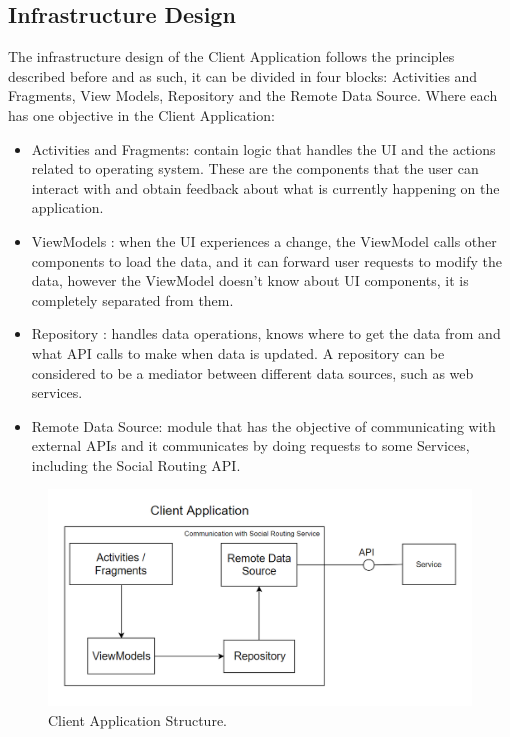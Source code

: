 \documentclass{article}
\begin{document}
        \subsection*{Infrastructure Design}
            The infrastructure design\cite{clientdesignandimplementationdocs} of the Client Application follows the principles described before and as such, it can be divided in four blocks: Activities and Fragments, 
            View Models, Repository and the Remote Data Source. Where each has one objective in the Client Application:
        \begin{itemize}
                \item Activities and Fragments: contain logic that handles the UI and the actions related to operating system. These are the components that 
                the user can interact with and obtain feedback about what is currently happening on the application.
                \item ViewModels : when the UI experiences a change, the ViewModel calls other components to load the data, and it can forward user requests 
                to modify the data, however the ViewModel doesn't know about UI components, it is completely separated from them.
                \item Repository : handles data operations, knows where to get the data from and what API calls to make when data is updated. 
                A repository can be considered to be a mediator between different data sources, such as web services.
                \item Remote Data Source: module that has the objective of communicating with external APIs and it communicates by doing requests to some Services, 
                including the Social Routing API.
            \end{itemize}
    
        \begin{figure}[h]            
            \includegraphics[width=\textwidth]{images/project-structure/social-routing-client-application-structure.PNG}
            \caption{Client Application Structure.}
            \label{fig:clientapplicationtructure}
        \end{figure}          
    
\end{document}

